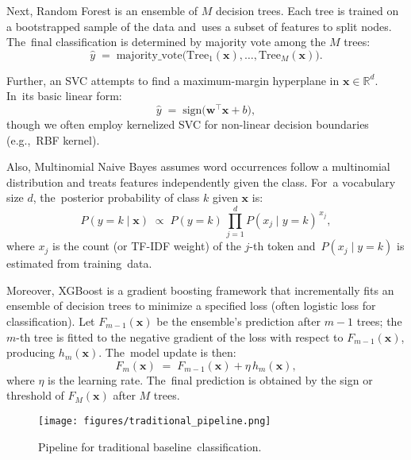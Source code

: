 \documentclass[electronics,article,accept,pdftex,moreauthors,electronics]{Definitions/mdpi}
\begin{document}
Next, Random Forest is an ensemble of $M$ decision trees. Each tree is trained on a bootstrapped 
sample of the data and~uses a subset of features to split nodes. The~final classification is 
determined by majority vote among the $M$ trees:
\begin{equation}
\hat{y} \;=\; \mathrm{majority\_vote}\bigl(\mathrm{Tree}_1(\mathbf{x}), \dots, \mathrm{Tree}_M(\mathbf{x})\bigr).
\end{equation}

Further, an SVC attempts to find a maximum-margin hyperplane in $\mathbf{x} \in \mathbb{R}^d$. In~its basic linear form:
\begin{equation}
\hat{y} \;=\; \mathrm{sign}\!\bigl(\boldsymbol{w}^\top \mathbf{x} + b\bigr),
\end{equation}
though we often employ kernelized SVC for non-linear decision boundaries (e.g.,~RBF kernel).

Also, Multinomial Naive Bayes assumes word occurrences follow a multinomial distribution and treats features 
independently given the class. For~a vocabulary size $d$, the~posterior probability of class $k$ 
given $\mathbf{x}$ is:
\begin{equation}
\label{eq:mnb}
P(y=k \mid \mathbf{x}) \;\propto\; P(y=k)\,\prod_{j=1}^{d} P(x_j \mid y=k)^{\,x_j},
\end{equation}
where $x_j$ is the count (or TF-IDF weight) of the $j$-th token and~$P(x_j \mid y=k)$ is 
estimated from training~data.

Moreover, XGBoost is a gradient boosting framework that incrementally fits an ensemble of decision trees 
to minimize a specified loss (often logistic loss for classification). Let $F_{m-1}(\mathbf{x})$ 
be the ensemble’s prediction after $m-1$ trees; the $m$-th tree is fitted to the negative gradient 
of the loss with respect to $F_{m-1}(\mathbf{x})$, producing $h_m(\mathbf{x})$. The~model update is then:
\begin{equation}
F_{m}(\mathbf{x}) \;=\; F_{m-1}(\mathbf{x}) + \eta \, h_m(\mathbf{x}),
\end{equation}
where $\eta$ is the learning rate. The~final prediction is obtained by the sign or threshold 
of $F_{M}(\mathbf{x})$ after $M$ trees.
\begin{figure}[H] %
    \centering
    \texttt{[image: figures/traditional\_pipeline.png]}
    \caption{Pipeline for traditional baseline~classification.}
    \label{fig4}
\end{figure}
\end{document}
